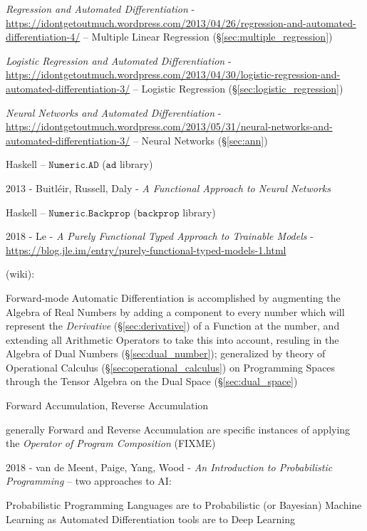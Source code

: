 \asterism

\emph{Regression and Automated Differentiation} -
\url{https://idontgetoutmuch.wordpress.com/2013/04/26/regression-and-automated-differentiation-4/}
-- Multiple Linear Regression (\S\ref{sec:multiple_regression})

\emph{Logistic Regression and Automated Differentiation} -
\url{https://idontgetoutmuch.wordpress.com/2013/04/30/logistic-regression-and-automated-differentiation-3/}
-- Logistic Regression (\S\ref{sec:logistic_regression})

\emph{Neural Networks and Automated Differentiation} -
\url{https://idontgetoutmuch.wordpress.com/2013/05/31/neural-networks-and-automated-differentiation-3/}
-- Neural Networks (\S\ref{sec:ann})

Haskell -- $\mathtt{Numeric.AD}$ ($\mathtt{ad}$ library)

2013 - Buitl\'eir, Russell, Daly -
\emph{A Functional Approach to Neural Networks}

Haskell -- $\mathtt{Numeric.Backprop}$ ($\mathtt{backprop}$ library)

2018 - Le - \emph{A Purely Functional Typed Approach to Trainable Models} -
\url{https://blog.jle.im/entry/purely-functional-typed-models-1.html}

\asterism

(wiki):

Forward-mode Automatic Differentiation is accomplished by augmenting the Algebra
of Real Numbers by adding a component to every number which will represent the
\emph{Derivative} (\S\ref{sec:derivative}) of a Function at the number, and
extending all Arithmetic Operators to take this into account, resuling in the
Algebra of Dual Numbers (\S\ref{sec:dual_number}); generalized by theory of
Operational Calculus (\S\ref{sec:operational_calculus}) on Programming Spaces
through the Tensor Algebra on the Dual Space (\S\ref{sec:dual_space})

Forward Accumulation, Reverse Accumulation

generally Forward and Reverse Accumulation are specific instances of applying
the \emph{Operator of Program Composition} (FIXME)

2018 - van de Meent, Paige, Yang, Wood -
\emph{An Introduction to Probabilistic Programming} --
two approaches to AI:

Probabilistic Programming Languages are to Probabilistic (or Bayesian) Machine
Learning as Automated Differentiation tools are to Deep Learning

